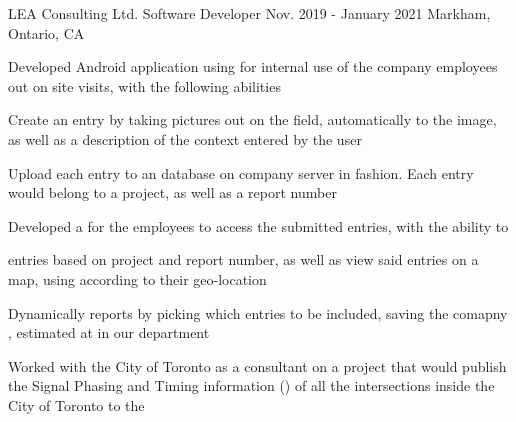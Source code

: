 

\begin{cventries}

  \cventry
  {LEA Consulting Ltd.} %
  {Software Developer} %
  {Nov. 2019 - January 2021} %
  {Markham, Ontario, CA} %
  {
    \begin{cvitems} %
      \item {Developed Android application using  for internal use of the company employees out on site visits, with the following abilities}
        \begin{cvsubitems}
          \item {Create an entry by taking pictures out on the field, automatically  to the image, as well as a description of the context entered by the user}
          \item {Upload each entry to an  database on company server in  fashion. Each entry would belong to a project, as well as a report number}
        \end{cvsubitems}
      \item {Developed a  for the employees to access the submitted entries, with the ability to}
        \begin{cvsubitems}
          \item { entries based on project and report number, as well as view said entries on a map, using  according to their geo-location}
          \item {Dynamically  reports by picking which entries to be included, saving the comapny , estimated at  in our department}
        \end{cvsubitems}
      \item {Worked with the City of Toronto as a consultant on a project that would publish the Signal Phasing and Timing information () of all the intersections inside the City of Toronto to the }

\end{cvitems}}
\end{cventries}

